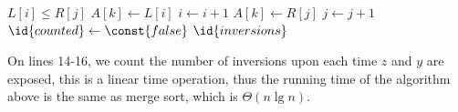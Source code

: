 \begin{enumerate}[leftmargin=*]
\begin{codebox}
                \End
        \li     \If $L[i]\le R[j]$
                \Then
        \li         $A[k]\gets L[i]$
        \li         $i\gets i+1$
        \li     \Else
        \li         $A[k]\gets R[j]$
        \li         $j\gets j+1$
        \li         $\id{counted}\gets\const{false}$
                \End
            \End
        \li {} $\id{inversions}$
        \end{codebox}
        On lines 14-16, we count the number of inversions upon each time $z$
        and $y$ are exposed, this is a linear time operation, thus the running
        time of the algorithm above is the same as merge sort, which is
        $\Theta(n\lg n)$.
\end{enumerate}
